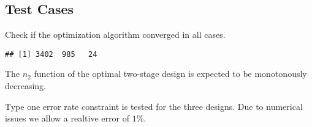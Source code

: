 \documentclass[]{book}
\newenvironment{Shaded}{\begin{snugshade}}{\end{snugshade}}
\newcommand{\ControlFlowTok}[1]{\textcolor[rgb]{0.13,0.29,0.53}{\textbf{#1}}}
\newcommand{\DecValTok}[1]{\textcolor[rgb]{0.00,0.00,0.81}{#1}}
\newcommand{\KeywordTok}[1]{\textcolor[rgb]{0.13,0.29,0.53}{\textbf{#1}}}
\newcommand{\NormalTok}[1]{#1}
\newcommand{\OperatorTok}[1]{\textcolor[rgb]{0.81,0.36,0.00}{\textbf{#1}}}
\newcommand{\StringTok}[1]{\textcolor[rgb]{0.31,0.60,0.02}{#1}}
\begin{document}
\hypertarget{test-cases}{%
\subsection{Test Cases}\label{test-cases}}

Check if the optimization algorithm converged in all cases.

\begin{Shaded}
\end{Shaded}

\begin{verbatim}
## [1] 3402  985   24
\end{verbatim}

\begin{Shaded}
\end{Shaded}

The \(n_2\) function of the optimal two-stage design is expected to be
monotonously decreasing.

\begin{Shaded}
\end{Shaded}

Type one error rate constraint is tested for the three designs.
Due to numerical issues we allow a realtive error of \(1\%\).
\end{document}
